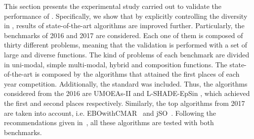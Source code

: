 This section presents the experimental study carried out to validate the performance of \DEEDM{}.
%
Specifically, we show that by explicitly controlling the diversity in \DE{}, results of state-of-the-art algorithms
are improved further.
%
Particularly, the benchmarks of \CEC{} 2016 and \CEC{} 2017 are considered.
%
Each one of them is composed of thirty different problems, meaning that the validation is performed with a set of large and diverse
functions.
%
The kind of problems of each benchmark are divided in uni-modal, simple multi-modal, hybrid and composition functions.
%
The state-of-the-art is composed by the algorithms that attained the first places of each year competition.
%
Additionally, the standard \DE{} was included.
%
Thus, the algorithms considered from the \CEC{} 2016 are UMOEAs-II \cite{elsayed2016testing} and L-SHADE-EpSin \cite{awad2016ensemble}, which achieved 
the first and second places respectively.
%
Similarly, the top algorithms from \CEC{} 2017 are taken into account, i.e. EBOwithCMAR~\cite{kumar2017improving} and jSO~\cite{brest2017single}.
%
%
%
Following the recommendations given in~\cite{molina2017analysis}, all these algorithms are tested with both benchmarks.

